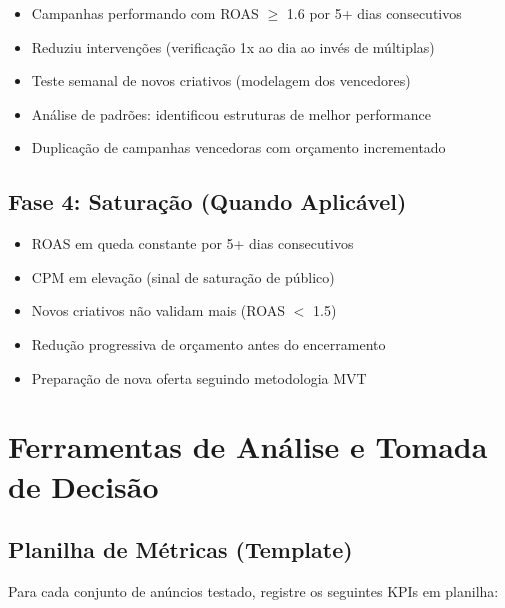 \documentclass[12pt, a4paper]{article}
\begin{document}
\begin{itemize}
    \item[$\square$] Campanhas performando com ROAS $\geq$ 1.6 por 5+ dias consecutivos
    \item[$\square$] Reduziu intervenções (verificação 1x ao dia ao invés de múltiplas)
    \item[$\square$] Teste semanal de novos criativos (modelagem dos vencedores)
    \item[$\square$] Análise de padrões: identificou estruturas de melhor performance
    \item[$\square$] Duplicação de campanhas vencedoras com orçamento incrementado
\end{itemize}

\subsection{Fase 4: Saturação (Quando Aplicável)}

\begin{itemize}
    \item[$\square$] ROAS em queda constante por 5+ dias consecutivos
    \item[$\square$] CPM em elevação (sinal de saturação de público)
    \item[$\square$] Novos criativos não validam mais (ROAS $<$ 1.5)
    \item[$\square$] Redução progressiva de orçamento antes do encerramento
    \item[$\square$] Preparação de nova oferta seguindo metodologia MVT
\end{itemize}

\needspace{8cm}

\section{Ferramentas de Análise e Tomada de Decisão}

\subsection{Planilha de Métricas (Template)}

Para cada conjunto de anúncios testado, registre os seguintes KPIs em planilha:
\end{document}
